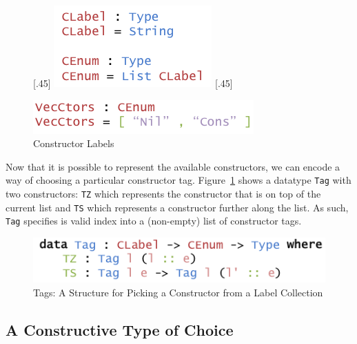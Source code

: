 \documentclass{ituthesis}
\begin{document}
\begin{figure}[ht]
\begin{center}
  [.45\textwidth]{
    \includegraphics[scale=0.5]{Figures/AnInformativeEncodingofConstructorsLabels.png}
}
[.45\textwidth]{
    \includegraphics[scale=0.5]{Figures/VectorConstructors.png}

}
\caption{Constructor Labels}
\end{center}
\end{figure}

Now that it is possible to represent the available constructors, we can encode a way of choosing a particular constructor tag. Figure~\ref{fig:ctortags} shows a datatype \texttt{Tag} with two constructors:
\texttt{TZ} which represents the constructor that is on top of the current list and \texttt{TS} which represents a constructor further along the list. As such, \texttt{Tag} specifies is valid index into a (non-empty) list of constructor tags.

\begin{figure}[ht]
\begin{center}
    \includegraphics[scale=0.5]{Figures/AnInformativeEncodingofConstructorsTags.png}
\end{center}
\caption{Tags: A Structure for Picking a Constructor from a Label Collection}
\label{fig:ctortags}
\end{figure}

\subsection{A Constructive Type of Choice}
\label{sub:AConstructiveTypeofChoice}
\end{document}
